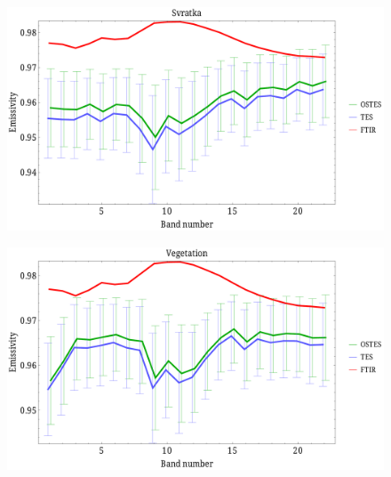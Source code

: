 \documentclass[xcolor=dvipsnames]{beamer}
\begin{document}
\begin{frame}[plain]{}
\begin{figure}[htb]
	\centering
	\includegraphics[scale=0.35]{Svratka_scaled.pdf}
\end{figure}
\end{frame}

\begin{frame}[plain]{}
\begin{figure}[htb]
	\centering
	\includegraphics[scale=0.35]{Vegetation_scaled.pdf}
\end{figure}
\end{frame}
\end{document}
